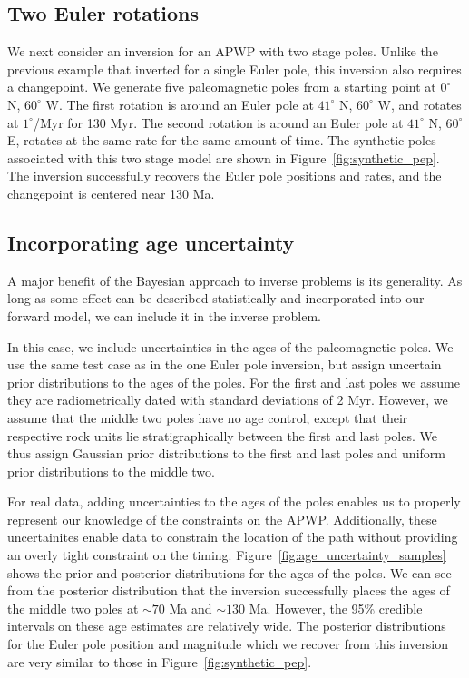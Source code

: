 \documentclass[11pt,letterpaper]{article}
\begin{document}

\subsection*{Two Euler rotations}
\label{sec:two_stage_poles}
We next consider an inversion for an APWP with two stage poles. Unlike the previous example that inverted for a single Euler pole, this inversion also requires a changepoint. We generate five paleomagnetic poles from a starting point at $0^\circ$ N, $60^\circ$ W. The first rotation is around an Euler pole at $41^\circ$ N, $60^\circ$ W, and rotates at $1^\circ$/Myr for 130 Myr. The second rotation is around an Euler pole at $41^\circ$ N, $60^\circ$ E, rotates at the same rate for the same amount of time. The synthetic poles associated with this two stage model are shown in Figure~\ref{fig:synthetic_pep}. The inversion successfully recovers the Euler pole positions and rates, and the changepoint is centered near 130 Ma.

\subsection*{Incorporating age uncertainty}
\label{sec:age_uncertainty}
A major benefit of the Bayesian approach to inverse problems is its generality. As long as some effect can be described statistically and incorporated into our forward model, we can include it in the inverse problem.

In this case, we include uncertainties in the ages of the paleomagnetic poles. We use the same test case as in the one Euler pole inversion, but assign uncertain prior distributions to the ages of the poles. For the first and last poles we assume they are radiometrically dated with standard deviations of 2 Myr. However, we assume that the middle two poles have no age control, except that their
respective rock units lie stratigraphically between the first and last poles. We thus assign Gaussian prior distributions to the first and last poles and uniform prior distributions
to the middle two.

For real data, adding uncertainties to the ages of the poles enables us to properly represent our knowledge of the constraints on the APWP. Additionally, these uncertainites enable data to constrain the location of the path without providing an overly tight constraint on the timing.
Figure~\ref{fig:age_uncertainty_samples} shows the prior and posterior distributions for the ages of the poles. We can see from the posterior distribution that the inversion successfully places the ages of the middle two poles at $\sim70$ Ma and $\sim130$ Ma. However, the 95\% credible intervals on these age estimates are relatively wide. The posterior distributions for the Euler pole position and magnitude which we recover from this inversion are very similar to those in Figure~\ref{fig:synthetic_pep}.
\end{document}
